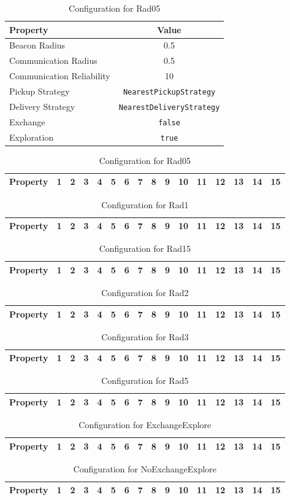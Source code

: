 \documentclass[10pt]{article}
\newcommand{\runtimeconfig}[8]{%
\begin{table}
	\centering
	\begin{tabular}{lc}
	\toprule
	Property & Value \\
	\midrule
	Beacon Radius & #2 \\
	Communication Radius & #2 \\
	Communication Reliability & #3 \\
	Pickup Strategy & \texttt{#5} \\
	Delivery Strategy & \texttt{#6} \\
	Exchange & \texttt{#7} \\
	Exploration & \texttt{#8} \\
	\bottomrule
	\end{tabular}
	\label{table:config:#1}
	\caption{Configuration for #1}
\end{table}
}
\newcommand{\datatable}[1]{%
\begin{table}
	\centering
	\begin{tabular}{lccccccccccccccc}
	\toprule
	Property & 1 & 2 & 3 & 4 & 5 & 6 & 7 & 8 & 9 & 10 & 11 & 12 & 13 & 14 & 15 \\
	\midrule
	
	\bottomrule
	\end{tabular}
	\label{table:data:#1}
	\caption{Configuration for #1}
\end{table}
}
\begin{document}
\runtimeconfig{Rad05}{0.5}{10}{1}{NearestPickupStrategy}{NearestDeliveryStrategy}{false}{true}

\datatable{Rad05}
\datatable{Rad1}
\datatable{Rad15}
\datatable{Rad2}
\datatable{Rad3}
\datatable{Rad5}
\datatable{ExchangeExplore}
\datatable{NoExchangeExplore}
\end{document}
